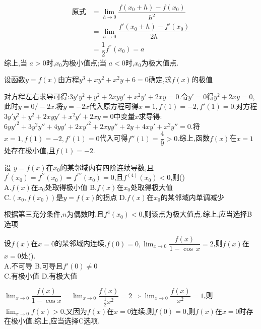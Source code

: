 \documentclass[8pt a4paper, oneside, UTF8]{ctexbook}  %
\begin{document}
\begin{sloppypar}
\begin{solution}
        \begin{align*}
            \text{原式} & = \lim_{h\to 0}\dfrac{f(x_0+h)-f(x_0)}{h^2}  \\
                      & = \lim_{h\to 0}\dfrac{f'(x_0+h)-f'(x_0)}{2h} \\
                      & = \dfrac{1}{2}f^{''}(x_0)=a
        \end{align*}
        综上,当 $a>0$时,$x_0$为极小值点;当 $a<0$时,$x_0$为极大值点.
    \end{solution}
    \begin{problem}
    设函数$y=f(x)$由方程$y^{3}+xy^{2}+x^{2}y+6=0$确定,求$f(x)$的极值
    \end{problem}
    \begin{solution}
        对方程左右求导可得:$3y'y^2+y^2+2xyy'+x^2y'+2xy=0$.令$y'=0$得$y^2+2xy=0$,此时$y=0/-2x$.将$y=-2x$代入原方程可得$x=1,f(1)=-2,f'(1)=0$.对方程$3y'y^2+y^2+2xyy'+x^2y'+2xy=0$中变量$x$求导得:$6yy'^2+3y^2y''+4yy'+2xy'^2+2xyy''+2y+4xy'+x^2y''=0$.将$x=1,f(1)=-2,f'(1)=0$代入可得$f''(1)=\dfrac{4}{9}>0$.综上,函数$f(x)$在$x=1$处存在极小值,且$f(1)=-2$.
    \end{solution}
    \begin{problem}
    设 $y=f(x)$在$x_{0}$的某邻域内有四阶连续导数,且$f^{\prime}(x_{0})=f^{\prime\prime}(x_{0})=f^{\prime\prime\prime}(x_{0})=0$,且$f^{(4)}\left(x_{0}\right)<0$,则()\\
    A.$f(x)$在$x_{0}$处取得极小值\quad
    B.$f(x)$在$x_{0}$处取得极大值\\
    C.$(x_{0},f(x_{0}))$是$y=f(x)$的拐点\quad
    D.$f(x)$在$x_{0}$的某邻域内单调减少
    \end{problem}
    \begin{solution}
        根据第三充分条件,$n$为偶数时,且$f^4(x_0)<0$,则该点为极大值点.综上,应当选择B选项
    \end{solution}
    \begin{problem}
    设$f(x)$在$x=0$的某邻域内连续,$f(0)=0,\operatorname*{lim}_{x\to0}\dfrac{f(x)}{1-\operatorname{cos}\,x}=2$,则$f(x)$在$x=0$处().\\
    A.不可导\quad
    B.可导且$f'(0)\neq0$\\
    C.有极小值\quad
    D.有极大值
    \end{problem}
    \begin{solution}
        $\lim_{x\to 0} \dfrac{f(x)}{1-\cos x}=\lim_{x\to 0} \dfrac{f(x)}{\frac{1}{2}x^2}=2  \Rightarrow \lim_{x\to 0} \dfrac{f(x)}{x^2}=1$,则$\lim_{x\to 0}f(x)>0$,又因为$f(x)$在$x=0$连续,则$f(0)=0$,则$f(x)$在$x=0$时存在极小值.综上,应当选择C选项.

\end{solution}
\end{sloppypar}
\end{document}

